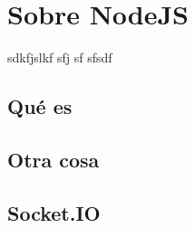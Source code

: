 \chapter{Sobre NodeJS}
\label{chap::nodejs}

sdkfjslkf sfj
sf
sfsdf


\section{Qué es}


\section{Otra cosa}





\section{Socket.IO}


